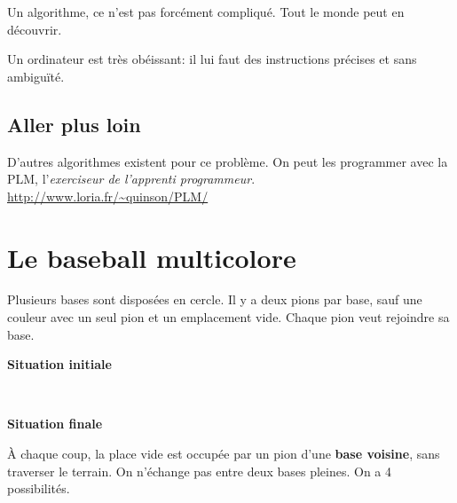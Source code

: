 \documentclass[a7paper,pagesize,DIV=14,10pt]{scrbook}
\begin{document}
Un algorithme, ce n'est pas forcément compliqué. Tout le monde peut en découvrir.

\smallskip
Un ordinateur est très obéissant: il lui faut des instructions
précises et sans ambiguïté.

\vspace{-.5\baselineskip}
\subsection*{Aller plus loin}
\vspace{-.5\baselineskip}
D'autres algorithmes existent pour ce problème. On peut les programmer
avec la PLM, l'\textit{exerciseur de l'apprenti programmeur}.\\
{\small\color{blue}\url{http://www.loria.fr/~quinson/PLM/}}

\newpage
\section*{Le baseball multicolore}


\vspace{-.5\baselineskip} %
Plusieurs bases sont disposées en cercle.  Il y a deux pions par base,
sauf une couleur avec un seul pion et un emplacement vide.  Chaque
pion veut rejoindre sa base.

\begin{minipage}{.5\linewidth}\center
   {}

 \textbf{Situation initiale} 
\end{minipage}~
\begin{minipage}{.5\linewidth}\center

  \textbf{Situation finale}
\end{minipage}

À chaque coup, la place vide est occupée par un pion d'une
\textbf{base voisine}, sans traverser le terrain. On n'échange pas
entre deux bases pleines. On a 4 possibilités.
\end{document}
